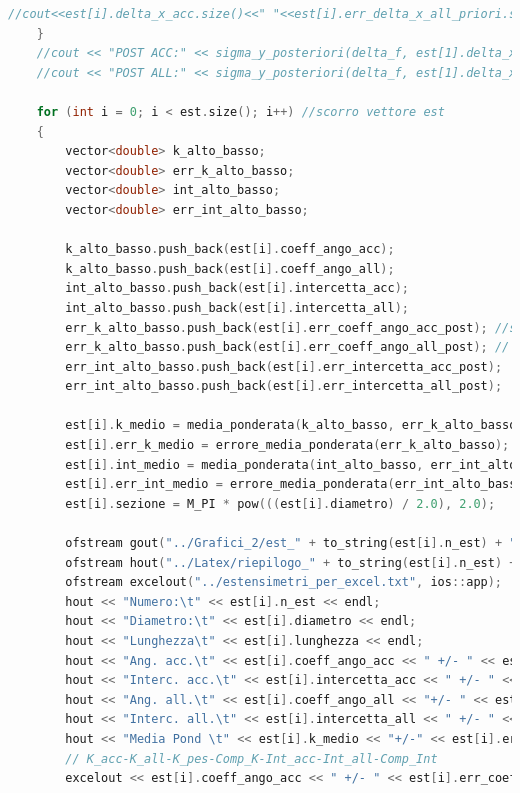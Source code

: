 \documentclass[a4paper,11pt,oneside]{article}
\begin{document}
\begin{lstlisting}[language=C++, label=lst:seconda_parte, caption=seconda\_parte]
		//cout<<est[i].delta_x_acc.size()<<" "<<est[i].err_delta_x_all_priori.size()<<endl;
	}
	//cout << "POST ACC:" << sigma_y_posteriori(delta_f, est[1].delta_x_acc) << endl;
	//cout << "POST ALL:" << sigma_y_posteriori(delta_f, est[1].delta_x_all) << endl;

	for (int i = 0; i < est.size(); i++) //scorro vettore est
	{
		vector<double> k_alto_basso;
		vector<double> err_k_alto_basso;
		vector<double> int_alto_basso;
		vector<double> err_int_alto_basso;

		k_alto_basso.push_back(est[i].coeff_ango_acc);
		k_alto_basso.push_back(est[i].coeff_ango_all);
		int_alto_basso.push_back(est[i].intercetta_acc);
		int_alto_basso.push_back(est[i].intercetta_all);
		err_k_alto_basso.push_back(est[i].err_coeff_ango_acc_post); //se non vuoi post elimina _post e utilizzerà errori piccoli
		err_k_alto_basso.push_back(est[i].err_coeff_ango_all_post); //
		err_int_alto_basso.push_back(est[i].err_intercetta_acc_post);
		err_int_alto_basso.push_back(est[i].err_intercetta_all_post);

		est[i].k_medio = media_ponderata(k_alto_basso, err_k_alto_basso);
		est[i].err_k_medio = errore_media_ponderata(err_k_alto_basso);
		est[i].int_medio = media_ponderata(int_alto_basso, err_int_alto_basso);
		est[i].err_int_medio = errore_media_ponderata(err_int_alto_basso);
		est[i].sezione = M_PI * pow(((est[i].diametro) / 2.0), 2.0);

		ofstream gout("../Grafici_2/est_" + to_string(est[i].n_est) + ".txt");	 //STAMPA PER FARE PLOT E RIEPILOGO
		ofstream hout("../Latex/riepilogo_" + to_string(est[i].n_est) + ".txt"); //RIEPILOGO PER LATEX
		ofstream excelout("../estensimetri_per_excel.txt", ios::app);
		hout << "Numero:\t" << est[i].n_est << endl;
		hout << "Diametro:\t" << est[i].diametro << endl;
		hout << "Lunghezza\t" << est[i].lunghezza << endl;
		hout << "Ang. acc.\t" << est[i].coeff_ango_acc << " +/- " << est[i].err_coeff_ango_acc_post << endl;	//
		hout << "Interc. acc.\t" << est[i].intercetta_acc << " +/- " << est[i].err_intercetta_acc_post << endl; //se non vuoi post elimina _post e utilizzerà errori piccoli
		hout << "Ang. all.\t" << est[i].coeff_ango_all << "+/- " << est[i].err_coeff_ango_all_post << endl;		//
		hout << "Interc. all.\t" << est[i].intercetta_all << " +/- " << est[i].err_intercetta_all_post << endl; //
		hout << "Media Pond \t" << est[i].k_medio << "+/-" << est[i].err_k_medio << endl;
		// K_acc-K_all-K_pes-Comp_K-Int_acc-Int_all-Comp_Int
		excelout << est[i].coeff_ango_acc << " +/- " << est[i].err_coeff_ango_acc_post << "\t" << est[i].coeff_ango_all << "+/- " << est[i].err_coeff_ango_all_post << "\t" << est[i].k_medio << "+/-" << est[i].err_k_medio << "\t" << comp_3(est[i].coeff_ango_acc, est[i].coeff_ango_all, est[i].err_coeff_ango_acc_post, est[i].err_coeff_ango_all_post) << "\t" << est[i].intercetta_acc << " +/- " << est[i].err_intercetta_acc_post << "\t" << est[i].intercetta_all << " +/- " << est[i].err_intercetta_all_post << "\t" << est[i].int_medio << " +/- " << est[i].err_int_medio << "\t" << comp_3(est[i].intercetta_acc, est[i].intercetta_all, est[i].err_intercetta_acc_post, est[i].err_intercetta_all_post) << endl;


\end{lstlisting}
\end{document}
